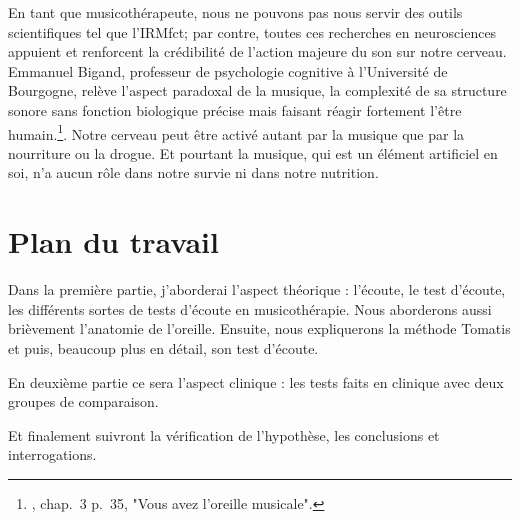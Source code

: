 En tant que musicothérapeute, nous ne pouvons pas  nous servir des outils
scientifiques tel que l'IRMfct; par contre, toutes ces recherches en
neurosciences appuient et renforcent la crédibilité de l'action
majeure du son sur notre cerveau.  Emmanuel Bigand, professeur de
psychologie cognitive à l'Université de Bourgogne, relève l'aspect
paradoxal de la musique, la complexité de sa structure sonore sans
fonction biologique précise mais faisant réagir fortement l'être
humain.\footnote{\cite{AuteurInconnu2011}, chap.~3 p.~35, "Vous avez l'oreille musicale".}.  Notre cerveau peut être activé autant par
la musique que par la nourriture ou la drogue. Et pourtant la musique,
qui est un élément artificiel en soi, n'a aucun rôle dans notre survie ni dans
notre nutrition.


\section{Plan du travail}

Dans la première partie, j'aborderai l'aspect théorique : l'écoute, le test d'écoute, les différents sortes de tests d'écoute en musicothérapie. Nous aborderons aussi brièvement l'anatomie de l'oreille. Ensuite, nous expliquerons la méthode Tomatis
et puis, beaucoup plus en détail, son test d'écoute.

En deuxième partie ce sera l'aspect clinique : les tests faits en clinique avec deux groupes de
comparaison.

Et finalement suivront la vérification de l'hypothèse, les conclusions et interrogations.
